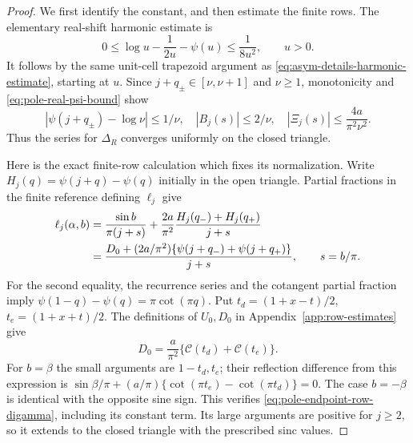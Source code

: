 \begin{proof}
We first identify the constant, and then estimate the finite rows.
The elementary real-shift harmonic estimate is
\begin{equation}\label{eq:pole-real-psi-bound}
 0\leq\log u-\frac1{2u}-\psi(u)\leq\frac1{8u^2},\qquad u>0.
\end{equation}
It follows by the same unit-cell trapezoid argument as
\eqref{eq:asym-details-harmonic-estimate}, starting at $u$.
Since $j+q_\pm\in[\nu,\nu+1]$ and $\nu\geq1$, monotonicity
and \eqref{eq:pole-real-psi-bound} show
\begin{equation}\label{eq:pole-Xi-bound}
 |\psi(j+q_\pm)-\log\nu|\leq1/\nu,
 \quad |B_j(s)|\leq2/\nu,
 \quad |\Xi_j(s)|\leq\frac{4a}{\pi^2\nu^2}.
\end{equation}
Thus the series for $\Delta_R$ converges uniformly on the closed
triangle.

Here is the exact finite-row calculation which fixes its normalization.
Write $H_j(q)=\psi(j+q)-\psi(q)$ initially in the open triangle.
Partial fractions in the finite reference defining $\ell_j$ give
\begin{align}
 \ell_j(\alpha,b)
 &=\frac{\sin b}{\pi(j+s)}+
       \frac{2a}{\pi^2}\frac{H_j(q_-)+H_j(q_+)}{j+s}
       \notag\\
 &=\frac{D_0+(2a/\pi^2)
             \{\psi(j+q_-)+\psi(j+q_+)\}}{j+s},
 \qquad s=b/\pi.
 \label{eq:pole-endpoint-row-digamma}
\end{align}
For the second equality, the recurrence series and the cotangent
partial fraction imply
$\psi(1-q)-\psi(q)=\pi\cot(\pi q)$.
Put $t_d=(1+x-t)/2$, $t_e=(1+x+t)/2$.  The definitions of
$U_0,D_0$ in Appendix~\ref{app:row-estimates} give
\[
 D_0=\frac a{\pi^2}\{\mathcal C(t_d)+\mathcal C(t_e)\}.
\]
For $b=\beta$ the small arguments are $1-t_d,t_e$; their
reflection difference from this expression is
$\sin\beta/\pi+(a/\pi)\{\cot(\pi t_e)-\cot(\pi t_d)\}=0$.
The case $b=-\beta$ is identical with the opposite sine sign.
This verifies \eqref{eq:pole-endpoint-row-digamma}, including its
constant term.  Its large arguments are positive for $j\geq2$,
so it extends to the closed triangle with the prescribed sinc values.


\end{proof}
